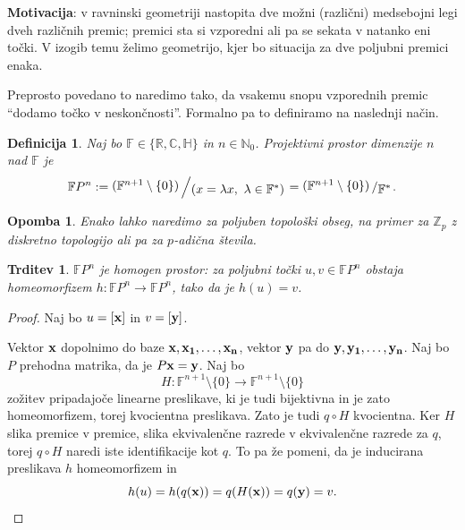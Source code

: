 \documentclass[10pt, a4paper]{article}
\newtheorem{trditev}[izr]{Trditev}
\newtheorem{defi}[izr]{Definicija}
\newenvironment{noticeB}{%
  \tcolorbox[%
  notitle,
  empty,
  enhanced,  %
  breakable,
  coltext=black,
  colback=white, 
  fontupper=\rmfamily,
  noparskip,
  sharp corners,
  boxrule=-1pt,  %
  frame hidden,
  left=7pt,  %
  right=7pt,
  top=5pt,
  bottom=5pt,
  before skip=2.5ex plus 2pt,
  after skip=2.5ex plus 2pt,
  borderline west = {1.5pt}{-0.1pt}{blue!30!black}, %
  overlay unbroken and last={%
    \draw[color=black, line width=1.25pt]
    ($(frame.south west)+(1.pt, -0.1pt)$) -- ++(2em, 0);
  }
  ]}
{\endtcolorbox}
\newenvironment{definicija}{\begin{noticeB}\begin{defi}}{%
\end{defi}\end{noticeB}}
\newtheorem*{opomba}{Opomba}
\newenvironment{noticeC}{%
  \tcolorbox[%
  notitle,
  empty,
  enhanced,  %
  breakable,
  coltext=black, 
  fontupper=\rmfamily,
  noparskip,
  sharp corners,
  boxrule=-1pt,  %
  frame hidden,
  left=7pt,  %
  right=7pt,
  top=5pt,
  bottom=5pt,
  before skip=2.5ex plus 2pt,
  after skip=2.5ex plus 2pt,
  overlay unbroken and last={%
  },
  ]}
{\endtcolorbox}
\newenvironment{dokaz}%
  {\begin{noticeC}\begin{proof}}%
  {\end{proof}\end{noticeC}}
\newcommand{\N}{\mathbb {N}}
\newcommand{\Z}{\mathbb {Z}}
\newcommand{\R}{\mathbb {R}}
\newcommand{\C}{\mathbb {C}}
\newcommand{\Ha}{\mathbb {H}}
\newcommand{\F}{\mathbb {F}}
\newcommand{\quot}[2]{{\raisebox{0.1em}{$#1$}\left/\raisebox{-0.2em}{$#2$}\right.}}
\begin{document}
\textbf{Motivacija}: v ravninski geometriji nastopita dve možni 
(različni) medsebojni legi dveh različnih premic; premici sta si vzporedni ali 
pa se sekata v natanko eni točki. V izogib temu želimo geometrijo,
kjer bo situacija za dve poljubni premici enaka.

Preprosto povedano to naredimo tako, da vsakemu snopu vzporednih premic "`dodamo točko v neskončnosti"'.
Formalno pa to definiramo na naslednji način.

\begin{definicija}
  Naj bo $\F \in \{\R, \C, \Ha\}$ in $n \in \N_0$.
  Projektivni prostor dimenzije $n$ nad $\F$ je 
  $$\F P^n := \quot{(\F^{n + 1} \setminus\{0\})}{(x = \lambda x,\ \lambda \in \F^*)} =  \quot{(\F^{n + 1} \setminus \{0\})}{\F^*}.$$
\end{definicija}

\begin{opomba}
  Enako lahko naredimo za poljuben topološki obseg, na primer za $\Z_p$ z diskretno topologijo 
  ali pa za $p$-adična števila.
\end{opomba}

\begin{trditev}
  $\F P^n$ je homogen prostor: za poljubni točki $u, v \in \F P^n$
  obstaja homeomorfizem $h: \F P^n \to \F P^n$, tako da je $h(u) = v$.
\end{trditev}

\begin{dokaz}
  Naj bo $u = [\vb{x}]$ in $v = [\vb{y}]$.
\begin{center}
  \adjustbox{scale=1.3,center}{
    \begin{tikzcd}
      \F^{n + 1} \setminus \{0\} \arrow[r, "H"] \arrow[d, "q"] \arrow[dr, "q \circ H"]
        & \F^{n + 1} \setminus \{0\} \arrow[d, "q"] \\
      \F P^n \arrow[r, dashed, "h"]
        & \F P^n
    \end{tikzcd}
  }  
\end{center}
Vektor $\vb{x}$ dopolnimo do baze $\vb{x}, \vb{x_1}, \dots, \vb{x_n}$,
vektor $\vb{y}$ pa do $\vb{y}, \vb{y_1}, \dots, \vb{y_n}$.
Naj bo $P$ prehodna matrika, da je $P \vb{x} = \vb{y}$.
Naj bo $$H : \F^{n + 1} \setminus\{0\} \to \F^{n + 1} \setminus \{0\}$$
zožitev pripadajoče linearne preslikave, ki je tudi bijektivna in je zato homeomorfizem,
torej kvocientna preslikava.
Zato je tudi $q \circ H$ kvocientna.
Ker $H$ slika premice v premice, slika ekvivalenčne razrede v ekvivalenčne razrede za $q$,
torej $q \circ H$ naredi iste identifikacije kot $q$. To pa že pomeni, da je inducirana preslikava $h$
homeomorfizem in 
\begin{equation*}
  h(u) = h(q(\vb{x})) = q(H(\vb{x})) = q(\vb{y}) = v. \qedhere
\end{equation*}
\end{dokaz}
\end{document}
